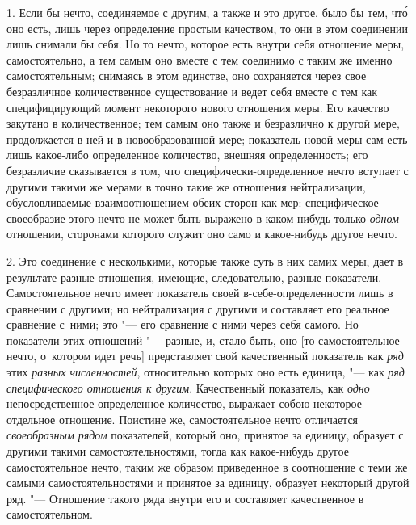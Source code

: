 1. Если бы нечто, соединяемое с другим, а также и это другое, было бы тем,
чт\'{о} оно есть, лишь через определение простым качеством, то они в этом
соединении лишь снимали бы себя. Но то нечто, которое есть внутри себя
отношение меры, самостоятельно, а тем самым оно вместе с тем соединимо с таким
же именно самостоятельным; снимаясь в этом единстве, оно сохраняется через свое
безразличное количественное существование и ведет себя вместе с тем как
специфицирующий момент некоторого нового отношения меры. Его качество закутано
в количественное; тем самым оно также и безразлично к другой мере, продолжается
в ней и в новообразованной мере; показатель новой меры сам есть лишь какое-либо
определенное количество, внешняя определенность; его безразличие сказывается в
том, что специфически-определенное нечто вступает с другими такими же мерами в
точно такие же отношения нейтрализации, обусловливаемые взаимоотношением обеих
сторон как мер: специфическое своеобразие этого нечто не может быть выражено в
каком-нибудь только {\em одном} отношении, сторонами которого служит оно само и
какое-нибудь другое нечто.

2. Это соединение с несколькими, которые также суть в них самих меры, дает в
результате разные отношения, имеющие, следовательно, разные показатели.
Самостоятельное нечто имеет показатель своей в-себе-определенности лишь в
сравнении с другими; но нейтрализация с другими и составляет его реальное
сравнение с~ними; это "--- его сравнение с ними через себя самого. Но
показатели этих отношений "--- разные, и, стало быть, оно [то самостоятельное
нечто, о~котором идет речь] представляет свой качественный показатель как
{\em ряд} этих {\em разных численностей}, относительно которых оно есть
единица, "--- как {\em ряд специфического отношения к другим}. Качественный
показатель, как {\em одно} непосредственное определенное количество, выражает
собою некоторое отдельное отношение. Поистине же, самостоятельное нечто
отличается {\em своеобразным рядом} показателей, который оно, принятое за
единицу, образует с другими такими самостоятельностями, тогда как какое-нибудь
другое самостоятельное нечто, таким же образом приведенное в соотношение с теми
же самыми самостоятельностями и принятое за единицу, образует некоторый другой
ряд. "--- Отношение такого ряда внутри его и составляет качественное в
самостоятельном.

